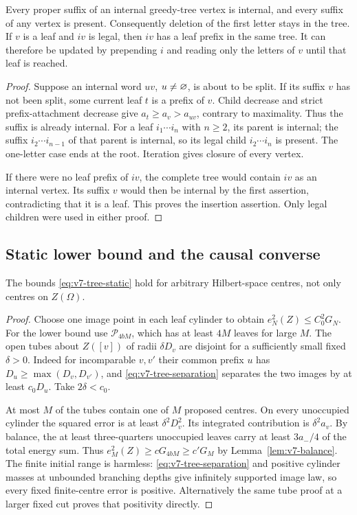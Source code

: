 \begin{lemma}\label{lem:v7-closure}
Every proper suffix of an internal greedy-tree vertex is internal, and
every suffix of any vertex is present. Consequently deletion of the
first letter stays in the tree. If $v$ is a leaf and $iv$ is legal, then
$iv$ has a leaf prefix in the same tree. It can therefore be updated
by prepending $i$ and reading only the letters of $v$ until that leaf is
reached.
\end{lemma}
\begin{proof}
Suppose an internal word $uv$, $u\ne\varnothing$, is about to be split.
If its suffix $v$ has not been split, some current leaf $t$ is a prefix
of $v$. Child decrease and strict prefix-attachment decrease give
$a_t\ge a_v>a_{uv}$, contrary to maximality. Thus the suffix is already
internal. For a leaf $i_1\cdots i_n$ with $n\ge2$, its parent is
internal; the suffix $i_2\cdots i_{n-1}$ of that parent is internal,
so its legal child $i_2\cdots i_n$ is present. The one-letter case
ends at the root. Iteration gives closure of every vertex.

If there were no leaf prefix of $iv$, the complete tree would contain
$iv$ as an internal vertex. Its suffix $v$ would then be internal by
the first assertion, contradicting that it is a leaf. This proves the
insertion assertion. Only legal children were used in either proof.
\end{proof}

\subsection{Static lower bound and the causal converse}
\begin{lemma}\label{lem:v7-static}
The bounds \eqref{eq:v7-tree-static} hold for arbitrary Hilbert-space
centres, not only centres on $Z(\Omega)$.
\end{lemma}
\begin{proof}
Choose one image point in each leaf cylinder to obtain
$e_N^2(Z)\le C_0^2G_N$. For the lower bound use $\mathcal P_{4bM}$,
which has at least $4M$ leaves for large $M$. The open tubes about
$Z([v])$ of radii $\delta D_v$ are disjoint for a sufficiently small
fixed $\delta>0$. Indeed for incomparable $v,v'$ their common prefix
$u$ has $D_u\ge\max(D_v,D_{v'})$, and
\eqref{eq:v7-tree-separation} separates the two images by at least
$c_0D_u$. Take $2\delta<c_0$.

At most $M$ of the tubes contain one of $M$ proposed centres. On every
unoccupied cylinder the squared error is at least $\delta^2D_v^2$.
Its integrated contribution is $\delta^2a_v$. By balance, the at least
three-quarters unoccupied leaves carry at least $3a_-/4$ of the total
energy sum. Thus $e_M^2(Z)\ge cG_{4bM}\ge c'G_M$ by
Lemma~\ref{lem:v7-balance}. The finite initial range is harmless:
\eqref{eq:v7-tree-separation} and positive cylinder masses at unbounded
branching depths give infinitely supported image law, so every fixed
finite-centre error is positive. Alternatively the same tube proof at
a larger fixed cut proves that positivity directly.
\end{proof}

